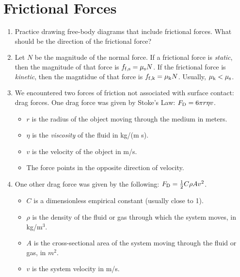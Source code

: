 \documentclass[10pt]{article}
\begin{document}
\section{Frictional Forces}
\begin{enumerate}
\item Practice drawing free-body diagrams that include frictional forces.  What should be the direction of the frictional force?
\item Let $N$ be the magnitude of the normal force.  If a frictional force is \textit{static}, then the magnitude of that force is $f_{\rm f,s} = \mu_{\rm s} N$.  If the frictional force is \textit{kinetic}, then the magntidue of that force is $f_{\rm f,k} = \mu_{\rm k} N$.  Usually, $\mu_{\rm k} < \mu_{\rm s}$.
\item We encountered two forces of friction not associated with surface contact: drag forces.  One drag force was given by Stoke's Law: $F_{\rm D} = 6\pi r \eta v$.
\begin{itemize}
\item $r$ is the radius of the object moving through the medium in meters.
\item $\eta$ is the \textit{viscosity} of the fluid in kg/(m s).
\item $v$ is the velocity of the object in m/s.
\item The force points in the opposite direction of velocity.
\end{itemize}
\item One other drag force was given by the following: $F_{\rm D} = \frac{1}{2}C\rho Av^2$.
\begin{itemize}
\item $C$ is a dimensionless empirical constant (usually close to 1).
\item $\rho$ is the density of the fluid or gas through which the system moves, in kg/m$^3$.
\item $A$ is the cross-sectional area of the system moving through the fluid or gas, in $m^2$.
\item $v$ is the system velocity in m/s.
\end{itemize}
\end{enumerate}
\end{document}
